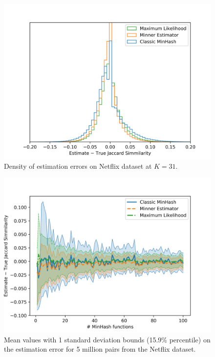 \begin{figure}
   \centering
   \includegraphics[trim=0 5 35 40,clip,width=\linewidth]{figures/hist2}
\caption{Density of estimation errors on Netflix dataset at $K=31$.
}
\end{figure}

\begin{figure}
   \centering
   \includegraphics[trim=0 0 35 40,clip,width=\linewidth]{figures/var2}
   \caption{
      Mean values with 1 standard deviation bounds (15.9\% percentile)
      on the estimation error for 5 million pairs from the Netflix dataset.
   }
   \label{fig:var}
\end{figure}
